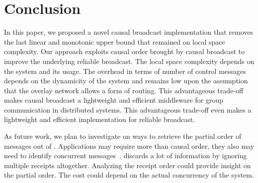 
\section{Conclusion}
\label{sec:conclusion}


In this paper, we proposed a novel causal broadcast implementation that removes
the last linear and monotonic upper bound that remained on local space
complexity. Our approach exploits causal order brought by causal broadcast to
improve the underlying reliable broadcast. The local space complexity depends on
the system and its usage. The overhead in terms of number of control messages
depends on the dynamicity of the system and remains low upon the assumption that
the overlay network allows a form of routing.
This advantageous trade-off makes causal broadcast a lightweight and efficient
middleware for group communication in distributed systems. This advantageous
trade-off even makes \RPCBROADCAST a lightweight and efficient implementation for
reliable broadcast. %

As future work, we plan to investigate on ways to retrieve the partial order of
messages out of \RPCBROADCAST. %
Applications may require more than causal order, they also may need to identify
concurrent messages~\cite{sun2009contextbased}. \RPCBROADCAST discards a lot of
information by ignoring multiple receipts altogether. Analyzing the receipt
order could provide insight on the partial order. The cost could depend on the
actual concurrency of the system.

